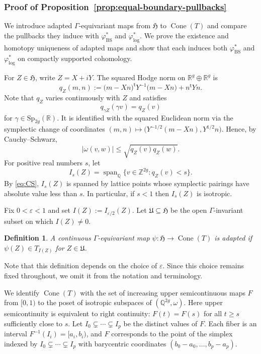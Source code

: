 \documentclass[12 pt]{amsart}
\newcommand{\fH}{\mathfrak H}
\newcommand{\fU}{\mathfrak U}
\newcommand{\QQ}{\mathbb{Q}}
\newcommand{\RR}{\mathbb{R}}
\newcommand{\ZZ}{\mathbb{Z}}
\newcommand{\BS}{\mathrm{BS}}
\newcommand{\Sp}{\mathrm{Sp}}
\newcommand{\Cone}{\operatorname{Cone}}
\newcommand{\<}{\langle}
\renewcommand{\>}{\rangle}
\newtheorem{definition}[theorem]{Definition}
\theoremstyle{definition}
\begin{document}
\subsubsection{Proof of Proposition~\ref{prop:equal-boundary-pullbacks}}\label{sec:comparison}

We introduce adapted $\Gamma$-equivariant maps from $\fH$ to $\Cone(T)$ and compare the pullbacks they induce with $\varphi_{\BS}^*$ and $\varphi_{\log}^*$. We prove the existence and homotopy uniqueness of adapted maps and show that each induces both $\varphi_{\BS}^*$ and $\varphi_{\log}^*$ on compactly supported cohomology.

\medskip

For $Z \in \fH$, write $Z = X + iY$. The squared Hodge norm on $\RR^g \oplus \RR^g$ is
\[
q_Z(m, n) := \bigl(m - X n\bigr)^{\mathsf t} Y^{-1}\bigl(m - X n\bigr) + n^{\mathsf t} Yn. 
\]
Note that $q_Z$ varies continuously with $Z$ and satisfies $$q_{\gamma Z}(\gamma v) = q_Z(v)$$ for $\gamma \in \Sp_{2g}(\RR)$. It is identified with the squared Euclidean norm via the symplectic change of coordinates $(m, n) \mapsto \bigl(Y^{-1/2}(m - X n), Y^{1/2} n\bigr)$. Hence, by Cauchy--Schwarz, 
\begin{equation} \label{eq:CS}
|\omega(v, w)| \leq \sqrt{q_Z(v) q_Z(w)}.
\end{equation}
For positive real numbers $s$, let
\[
I_s(Z) = \operatorname{span}_{\QQ} \{v \in \ZZ^{2g} : q_Z(v) < s \}.
\]
By \eqref{eq:CS}, $I_s(Z)$ is spanned by lattice points whose symplectic pairings have absolute value less than $s$. In particular, if $s < 1$ then $I_s(Z)$ is isotropic. 

Fix $0 < \varepsilon < 1$ and set $I(Z) := I_{\varepsilon/2}(Z)$. Let $\fU \subseteq \fH$ be the open $\Gamma$-invariant subset on which $I(Z) \ne 0$.

\begin{definition} 
A continuous $\Gamma$-equivariant map $\psi \colon \fH \to \Cone(T)$ is \emph{adapted} if $\psi(Z) \in T_{I(Z)}$ for $Z \in \fU$.
\end{definition}

\noindent Note that this definition depends on the choice of $\varepsilon$. Since this choice remains fixed throughout, we omit it from the notation and terminology.

We identify $\Cone(T)$ with the set of increasing upper semicontinuous maps $F$ from $[0, 1)$ to the poset of isotropic subspaces of $(\QQ^{2g}, \omega)$. Here upper semicontinuity is equivalent to right continuity: $F(t) = F(s)$ for all $t \geq s$ sufficiently close to $s$. Let $I_0 \subsetneq \cdots \subsetneq I_p$ be the distinct values of $F$. Each fiber is an interval $F^{-1}(I_i) = [a_i, b_i)$, and $F$ corresponds to the point of the simplex indexed by $I_0 \subsetneq \cdots \subsetneq I_p$ with barycentric coordinates $(b_0 - a_0, \ldots, b_p - a_p)$.
\end{document}
